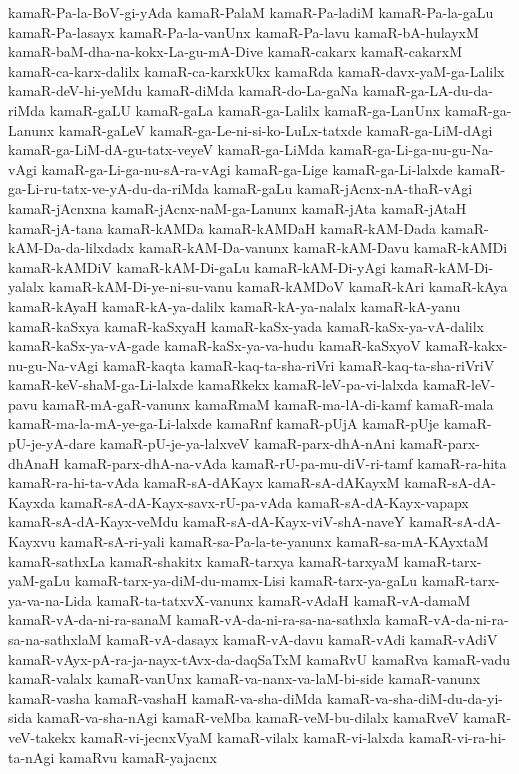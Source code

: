 {kamaR-Pa-la-BoV-gi-yAda
kamaR-PalaM
kamaR-Pa-ladiM
kamaR-Pa-la-gaLu
kamaR-Pa-lasayx
kamaR-Pa-la-vanUnx
kamaR-Pa-lavu
kamaR-bA-hulayxM
kamaR-baM-dha-na-kokx-La-gu-mA-Dive
kamaR-cakarx
kamaR-cakarxM
kamaR-ca-karx-dalilx
kamaR-ca-karxkUkx
kamaRda
kamaR-davx-yaM-ga-Lalilx
kamaR-deV-hi-yeMdu
kamaR-diMda
kamaR-do-La-gaNa
kamaR-ga-LA-du-da-riMda
kamaR-gaLU
kamaR-gaLa
kamaR-ga-Lalilx
kamaR-ga-LanUnx
kamaR-ga-Lanunx
kamaR-gaLeV
kamaR-ga-Le-ni-si-ko-LuLx-tatxde
kamaR-ga-LiM-dAgi
kamaR-ga-LiM-dA-gu-tatx-veyeV
kamaR-ga-LiMda
kamaR-ga-Li-ga-nu-gu-Na-vAgi
kamaR-ga-Li-ga-nu-sA-ra-vAgi
kamaR-ga-Lige
kamaR-ga-Li-lalxde
kamaR-ga-Li-ru-tatx-ve-yA-du-da-riMda
kamaR-gaLu
kamaR-jAcnx-nA-thaR-vAgi
kamaR-jAcnxna
kamaR-jAcnx-naM-ga-Lanunx
kamaR-jAta
kamaR-jAtaH
kamaR-jA-tana
kamaR-kAMDa
kamaR-kAMDaH
kamaR-kAM-Dada
kamaR-kAM-Da-da-lilxdadx
kamaR-kAM-Da-vanunx
kamaR-kAM-Davu
kamaR-kAMDi
kamaR-kAMDiV
kamaR-kAM-Di-gaLu
kamaR-kAM-Di-yAgi
kamaR-kAM-Di-yalalx
kamaR-kAM-Di-ye-ni-su-vanu
kamaR-kAMDoV
kamaR-kAri
kamaR-kAya
kamaR-kAyaH
kamaR-kA-ya-dalilx
kamaR-kA-ya-nalalx
kamaR-kA-yanu
kamaR-kaSxya
kamaR-kaSxyaH
kamaR-kaSx-yada
kamaR-kaSx-ya-vA-dalilx
kamaR-kaSx-ya-vA-gade
kamaR-kaSx-ya-va-hudu
kamaR-kaSxyoV
kamaR-kakx-nu-gu-Na-vAgi
kamaR-kaqta
kamaR-kaq-ta-sha-riVri
kamaR-kaq-ta-sha-riVriV
kamaR-keV-shaM-ga-Li-lalxde
kamaRkekx
kamaR-leV-pa-vi-lalxda
kamaR-leV-pavu
kamaR-mA-gaR-vanunx
kamaRmaM
kamaR-ma-lA-di-kamf
kamaR-mala
kamaR-ma-la-mA-ye-ga-Li-lalxde
kamaRnf
kamaR-pUjA
kamaR-pUje
kamaR-pU-je-yA-dare
kamaR-pU-je-ya-lalxveV
kamaR-parx-dhA-nAni
kamaR-parx-dhAnaH
kamaR-parx-dhA-na-vAda
kamaR-rU-pa-mu-diV-ri-tamf
kamaR-ra-hita
kamaR-ra-hi-ta-vAda
kamaR-sA-dAKayx
kamaR-sA-dAKayxM
kamaR-sA-dA-Kayxda
kamaR-sA-dA-Kayx-savx-rU-pa-vAda
kamaR-sA-dA-Kayx-vapapx
kamaR-sA-dA-Kayx-veMdu
kamaR-sA-dA-Kayx-viV-shA-naveY
kamaR-sA-dA-Kayxvu
kamaR-sA-ri-yali
kamaR-sa-Pa-la-te-yanunx
kamaR-sa-mA-KAyxtaM
kamaR-sathxLa
kamaR-shakitx
kamaR-tarxya
kamaR-tarxyaM
kamaR-tarx-yaM-gaLu
kamaR-tarx-ya-diM-du-mamx-Lisi
kamaR-tarx-ya-gaLu
kamaR-tarx-ya-va-na-Lida
kamaR-ta-tatxvX-vanunx
kamaR-vAdaH
kamaR-vA-damaM
kamaR-vA-da-ni-ra-sanaM
kamaR-vA-da-ni-ra-sa-na-sathxla
kamaR-vA-da-ni-ra-sa-na-sathxlaM
kamaR-vA-dasayx
kamaR-vA-davu
kamaR-vAdi
kamaR-vAdiV
kamaR-vAyx-pA-ra-ja-nayx-tAvx-da-daqSaTxM
kamaRvU
kamaRva
kamaR-vadu
kamaR-valalx
kamaR-vanUnx
kamaR-va-nanx-va-laM-bi-side
kamaR-vanunx
kamaR-vasha
kamaR-vashaH
kamaR-va-sha-diMda
kamaR-va-sha-diM-du-da-yi-sida
kamaR-va-sha-nAgi
kamaR-veMba
kamaR-veM-bu-dilalx
kamaRveV
kamaR-veV-takekx
kamaR-vi-jecnxVyaM
kamaR-vilalx
kamaR-vi-lalxda
kamaR-vi-ra-hi-ta-nAgi
kamaRvu
kamaR-yajacnx
}
